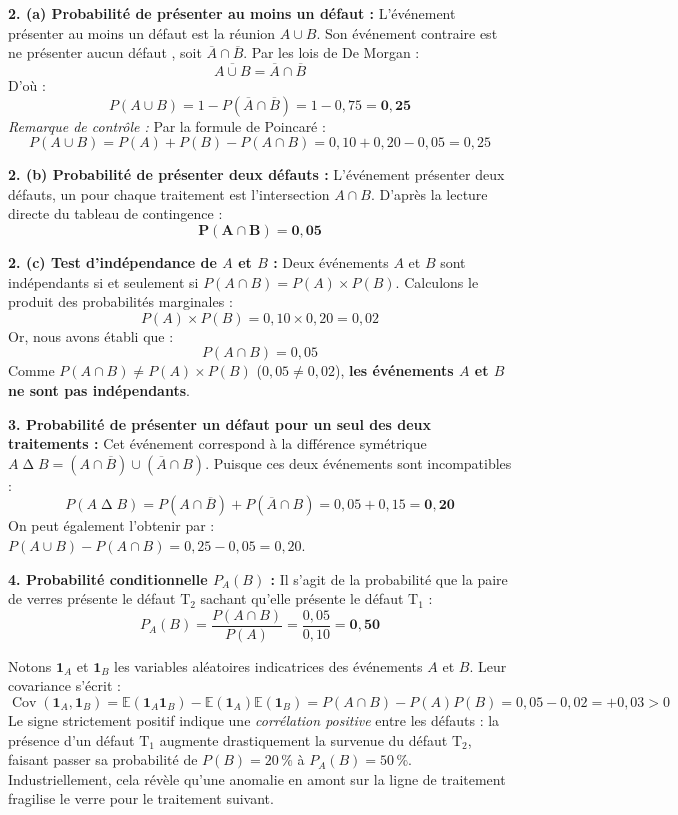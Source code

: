 \documentclass[11pt,a4paper]{article}
\newcommand{\E}{\mathbb{E}}
\newcommand{\un}{\mathbf{1}}
\begin{document}
\begin{correctionbox}
\textbf{2. (a) Probabilité de présenter au moins un défaut :}
L'événement \og présenter au moins un défaut \fg{} est la réunion $A \cup B$. Son événement contraire est \og ne présenter aucun défaut \fg{}, soit $\overline{A} \cap \overline{B}$. Par les lois de De Morgan :
\[
\overline{A \cup B} = \overline{A} \cap \overline{B}
\]
D'où :
\[
P(A \cup B) = 1 - P(\overline{A} \cap \overline{B}) = 1 - 0{,}75 = \mathbf{0{,}25}
\]
\emph{Remarque de contrôle :} Par la formule de Poincaré :
\[
P(A \cup B) = P(A) + P(B) - P(A \cap B) = 0{,}10 + 0{,}20 - 0{,}05 = 0{,}25
\]

\textbf{2. (b) Probabilité de présenter deux défauts :}
L'événement \og présenter deux défauts, un pour chaque traitement \fg{} est l'intersection $A \cap B$.
D'après la lecture directe du tableau de contingence :
\[
\mathbf{P(A \cap B) = 0{,}05}
\]

\textbf{2. (c) Test d'indépendance de $A$ et $B$ :}
Deux événements $A$ et $B$ sont indépendants si et seulement si $P(A \cap B) = P(A) \times P(B)$.
Calculons le produit des probabilités marginales :
\[
P(A) \times P(B) = 0{,}10 \times 0{,}20 = 0{,}02
\]
Or, nous avons établi que :
\[
P(A \cap B) = 0{,}05
\]
Comme $P(A \cap B) \neq P(A) \times P(B)$ ($0{,}05 \neq 0{,}02$), \textbf{les événements $A$ et $B$ ne sont pas indépendants}.

\textbf{3. Probabilité de présenter un défaut pour un seul des deux traitements :}
Cet événement correspond à la différence symétrique $A \mathbin{\Delta} B = (A \cap \overline{B}) \cup (\overline{A} \cap B)$.
Puisque ces deux événements sont incompatibles :
\[
P(A \mathbin{\Delta} B) = P(A \cap \overline{B}) + P(\overline{A} \cap B) = 0{,}05 + 0{,}15 = \mathbf{0{,}20}
\]
On peut également l'obtenir par : $P(A \cup B) - P(A \cap B) = 0{,}25 - 0{,}05 = 0{,}20$.

\textbf{4. Probabilité conditionnelle $P_A(B)$ :}
Il s'agit de la probabilité que la paire de verres présente le défaut $\mathrm{T}_2$ sachant qu'elle présente le défaut $\mathrm{T}_1$ :
\[
P_A(B) = \frac{P(A \cap B)}{P(A)} = \frac{0{,}05}{0{,}10} = \mathbf{0{,}50}
\]
\end{correctionbox}

\begin{remarquebox}
Notons $\un_A$ et $\un_B$ les variables aléatoires indicatrices des événements $A$ et $B$.
Leur covariance s'écrit :
\[
\operatorname{Cov}(\un_A, \un_B) = \E(\un_A \un_B) - \E(\un_A)\E(\un_B) = P(A \cap B) - P(A)P(B) = 0{,}05 - 0{,}02 = +0{,}03 > 0
\]
Le signe strictement positif indique une \emph{corrélation positive} entre les défauts : la présence d'un défaut $\mathrm{T}_1$ augmente drastiquement la survenue du défaut $\mathrm{T}_2$, faisant passer sa probabilité de $P(B) = 20\,\%$ à $P_A(B) = 50\,\%$. Industriellement, cela révèle qu'une anomalie en amont sur la ligne de traitement fragilise le verre pour le traitement suivant.
\end{remarquebox}
\end{document}
